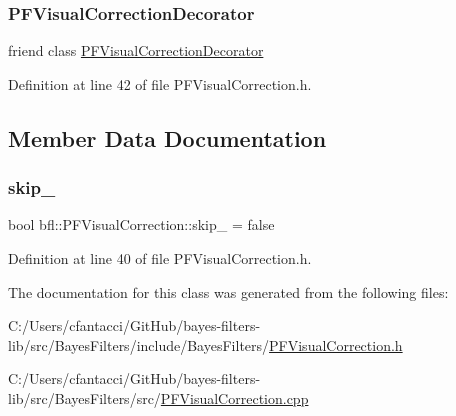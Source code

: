 \subsubsection{\texorpdfstring{P\+F\+Visual\+Correction\+Decorator}{PFVisualCorrectionDecorator}}
{\footnotesize\ttfamily friend class \mbox{\hyperlink{classbfl_1_1PFVisualCorrectionDecorator}{P\+F\+Visual\+Correction\+Decorator}}\hspace{0.3cm}{\ttfamily [friend]}}



Definition at line 42 of file P\+F\+Visual\+Correction.\+h.



\subsection{Member Data Documentation}
\mbox{\label{classbfl_1_1PFVisualCorrection_ad0b76bc0a2506bf02f56d393ab09b2a4}} 
\subsubsection{\texorpdfstring{skip\+\_\+}{skip\_}}
{\footnotesize\ttfamily bool bfl\+::\+P\+F\+Visual\+Correction\+::skip\+\_\+ = false\hspace{0.3cm}{\ttfamily [private]}}



Definition at line 40 of file P\+F\+Visual\+Correction.\+h.



The documentation for this class was generated from the following files\+:\begin{DoxyCompactItemize}
\item 
C\+:/\+Users/cfantacci/\+Git\+Hub/bayes-\/filters-\/lib/src/\+Bayes\+Filters/include/\+Bayes\+Filters/\mbox{\hyperlink{PFVisualCorrection_8h}{P\+F\+Visual\+Correction.\+h}}\item 
C\+:/\+Users/cfantacci/\+Git\+Hub/bayes-\/filters-\/lib/src/\+Bayes\+Filters/src/\mbox{\hyperlink{PFVisualCorrection_8cpp}{P\+F\+Visual\+Correction.\+cpp}}\end{DoxyCompactItemize}
